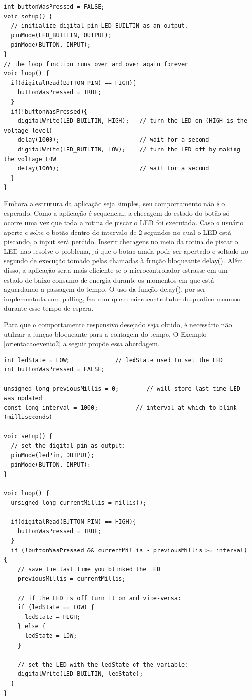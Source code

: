 \documentclass[11pt]{article}
\begin{document}
\begin{lstlisting}[style=CStyle,label=orientacaoevento1,caption=Aplicação bloqueante]
int buttonWasPressed = FALSE;
void setup() {
  // initialize digital pin LED_BUILTIN as an output.
  pinMode(LED_BUILTIN, OUTPUT);
  pinMode(BUTTON, INPUT);
}
// the loop function runs over and over again forever
void loop() {
  if(digitalRead(BUTTON_PIN) == HIGH){
    buttonWasPressed = TRUE;
  }
  if(!buttonWasPressed){ 
    digitalWrite(LED_BUILTIN, HIGH);   // turn the LED on (HIGH is the voltage level)
    delay(1000);                       // wait for a second
    digitalWrite(LED_BUILTIN, LOW);    // turn the LED off by making the voltage LOW
    delay(1000);                       // wait for a second
  }
}
\end{lstlisting}
\par Embora a estrutura da aplicação seja simples, seu comportamento não é o esperado. Como a aplicação é sequencial, a checagem do estado do botão só ocorre uma vez que toda a rotina de piscar o LED foi executada. Caso o usuário aperte e solte o botão dentro do intervalo de 2 segundos no qual o LED está piscando, o input será perdido. Inserir checagens no meio da rotina de piscar o LED não resolve o problema, já que o botão ainda pode ser apertado e soltado no segundo de execução tomado pelas chamadas à função bloqueante delay(). Além disso, a aplicação seria mais eficiente se o microcontrolador estrasse em um estado de baixo consumo de energia durante os momentos em que está aguardando a passagem do tempo. O uso da função delay(), por ser implementada com polling, faz com que o microcontrolador desperdice recursos durante esse tempo de espera.
\par Para que o comportamento responsivo desejado seja obtido, é necessário não utilizar a função bloqueante para a contagem do tempo. O Exemplo \ref{orientacaoevento2} a seguir propõe essa abordagem.
\begin{lstlisting}[style=CStyle,label=orientacaoevento2,caption=Aplicação não bloqueante]
int ledState = LOW;             // ledState used to set the LED
int buttonWasPressed = FALSE;

unsigned long previousMillis = 0;        // will store last time LED was updated
const long interval = 1000;           // interval at which to blink (milliseconds)

void setup() {
  // set the digital pin as output:
  pinMode(ledPin, OUTPUT);
  pinMode(BUTTON, INPUT);
}

void loop() {
  unsigned long currentMillis = millis();

  if(digitalRead(BUTTON_PIN) == HIGH){
    buttonWasPressed = TRUE;
  }
  if (!buttonWasPressed && currentMillis - previousMillis >= interval) {
    // save the last time you blinked the LED
    previousMillis = currentMillis;

    // if the LED is off turn it on and vice-versa:
    if (ledState == LOW) {
      ledState = HIGH;
    } else {
      ledState = LOW;
    }

    // set the LED with the ledState of the variable:
    digitalWrite(LED_BUILTIN, ledState);
  }
}
\end{lstlisting}
\end{document}
